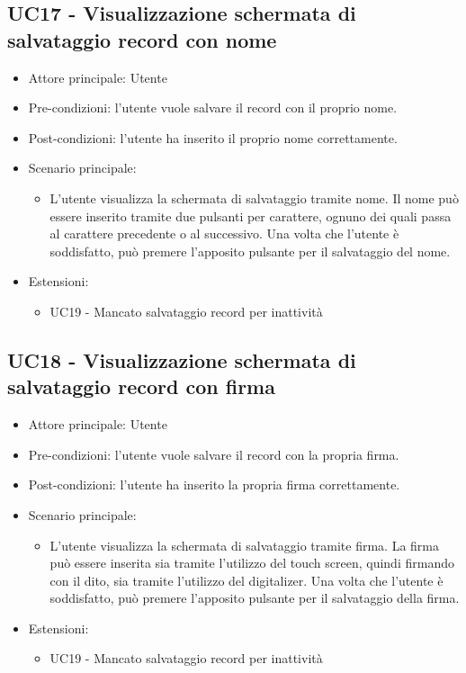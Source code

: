 \subsection{UC17 - Visualizzazione schermata di salvataggio record con nome}
\begin{itemize}
    \item Attore principale: Utente
    \item Pre-condizioni: l'utente vuole salvare il record con il proprio nome.
    \item Post-condizioni: l'utente ha inserito il proprio nome correttamente.
    \item Scenario principale: \begin{itemize}
        \item L'utente visualizza la schermata di salvataggio tramite nome. Il nome può essere inserito tramite due pulsanti per carattere, ognuno dei quali passa al carattere precedente o al successivo. Una volta che l'utente è soddisfatto, può premere l'apposito pulsante per il salvataggio del nome.
    \end{itemize}
    \item Estensioni: \begin{itemize}
        \item UC19 - Mancato salvataggio record per inattività
    \end{itemize}
\end{itemize}


\subsection{UC18 - Visualizzazione schermata di salvataggio record con firma}
\begin{itemize}
    \item Attore principale: Utente
    \item Pre-condizioni: l'utente vuole salvare il record con la propria firma.
    \item Post-condizioni: l'utente ha inserito la propria firma correttamente.
    \item Scenario principale: \begin{itemize}
        \item L'utente visualizza la schermata di salvataggio tramite firma. La firma può essere inserita sia tramite l'utilizzo del touch screen, quindi firmando con il dito, sia tramite l'utilizzo del digitalizer. Una volta che l'utente è soddisfatto, può premere l'apposito pulsante per il salvataggio della firma.
    \end{itemize}
    \item Estensioni: \begin{itemize}
        \item UC19 - Mancato salvataggio record per inattività
    \end{itemize}
\end{itemize}

